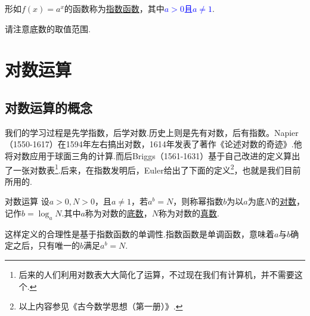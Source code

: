 \documentclass[lang=cn,math=cm,chinesefont=nofont,11pt,scheme=chinese,twocol]{elegantbook}
\begin{document}
\begin{definition}
  形如$f(x)=a^x$的函数称为\underline{指数函数}，其中\textcolor{blue}{$a>0$且$a\neq 1$}.
\end{definition}

请注意底数的取值范围.

\section{对数运算}

\subsection{对数运算的概念}

我们的学习过程是先学指数，后学对数.历史上则是先有对数，后有指数。Napier（1550-1617）在1594年左右搞出对数，1614年发表了著作《论述对数的奇迹》.他将对数应用于球面三角的计算.而后Briggs（1561-1631）基于自己改进的定义算出了一张对数表\footnote{后来的人们利用对数表大大简化了运算，不过现在我们有计算机，并不需要这个.}.后来，在指数发明后，Euler给出了下面的定义\footnote{以上内容参见《古今数学思想（第一册）》.}，也就是我们目前所用的.

\begin{definition}{对数运算}
  设$a>0,N>0$，且$a\neq 1$，若$a^b=N$，则称幂指数$b$为以$a$为底$N$的\underline{对数}，记作$b=\log_aN$.其中$a$称为对数的\underline{底数}，$N$称为对数的\underline{真数}.
\end{definition}

\begin{remark}
  这样定义的合理性是基于指数函数的单调性.指数函数是单调函数，意味着$a$与$b$确定之后，只有唯一的$b$满足$a^b=N$.
\end{remark}
\end{document}
